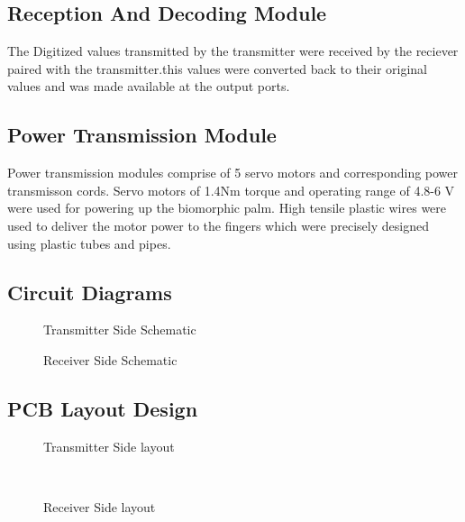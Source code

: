 \documentclass[a4paper, 12pt, notitlepage]{report}
\begin{document}
\subsection{Reception And Decoding Module}

The Digitized values transmitted by the transmitter were received by the reciever paired with the transmitter.this values were converted back to their original values and was made available at the output ports.\\

\subsection{Power Transmission Module}

Power transmission modules comprise of 5 servo motors and corresponding power transmisson cords. Servo motors of 1.4Nm torque and operating range of 4.8-6 V were used for powering up the biomorphic palm. High tensile plastic wires were used to deliver the motor power to the fingers which were precisely designed using plastic tubes and pipes.\\

\subsection{Circuit Diagrams}
\begin{figure}[h!]
{\par}
\caption{Transmitter Side Schematic}
\end{figure}

\begin{figure}[h!]
{\par}
\caption{Receiver Side Schematic}
\end{figure}

\newpage
\subsection{PCB Layout Design}
\begin{figure}[h!]
{\par}
\caption{Transmitter Side layout}
\end{figure}\\

\begin{figure}[h!]
{\par}
\caption{Receiver Side layout}
\end{figure}
\end{document}
